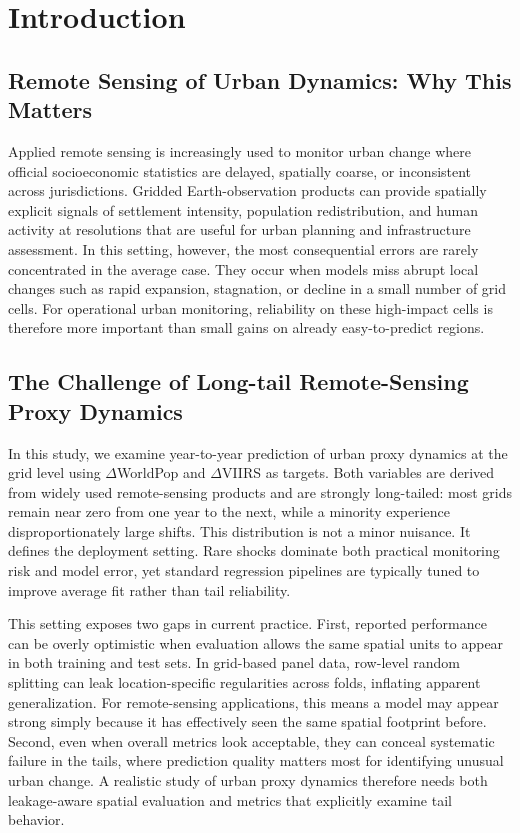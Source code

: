 \documentclass[preprint,12pt]{elsarticle}
\begin{document}
\section{Introduction}

\subsection{Remote Sensing of Urban Dynamics: Why This Matters}
Applied remote sensing is increasingly used to monitor urban change where official socioeconomic statistics are delayed, spatially coarse, or inconsistent across jurisdictions. Gridded Earth-observation products can provide spatially explicit signals of settlement intensity, population redistribution, and human activity at resolutions that are useful for urban planning and infrastructure assessment. In this setting, however, the most consequential errors are rarely concentrated in the average case. They occur when models miss abrupt local changes such as rapid expansion, stagnation, or decline in a small number of grid cells. For operational urban monitoring, reliability on these high-impact cells is therefore more important than small gains on already easy-to-predict regions.

\subsection{The Challenge of Long-tail Remote-Sensing Proxy Dynamics}

In this study, we examine year-to-year prediction of urban proxy dynamics at the grid level using $\Delta$WorldPop and $\Delta$VIIRS as targets. Both variables are derived from widely used remote-sensing products and are strongly long-tailed: most grids remain near zero from one year to the next, while a minority experience disproportionately large shifts. This distribution is not a minor nuisance. It defines the deployment setting. Rare shocks dominate both practical monitoring risk and model error, yet standard regression pipelines are typically tuned to improve average fit rather than tail reliability.

This setting exposes two gaps in current practice. First, reported performance can be overly optimistic when evaluation allows the same spatial units to appear in both training and test sets. In grid-based panel data, row-level random splitting can leak location-specific regularities across folds, inflating apparent generalization. For remote-sensing applications, this means a model may appear strong simply because it has effectively seen the same spatial footprint before. Second, even when overall metrics look acceptable, they can conceal systematic failure in the tails, where prediction quality matters most for identifying unusual urban change. A realistic study of urban proxy dynamics therefore needs both leakage-aware spatial evaluation and metrics that explicitly examine tail behavior.
\end{document}
